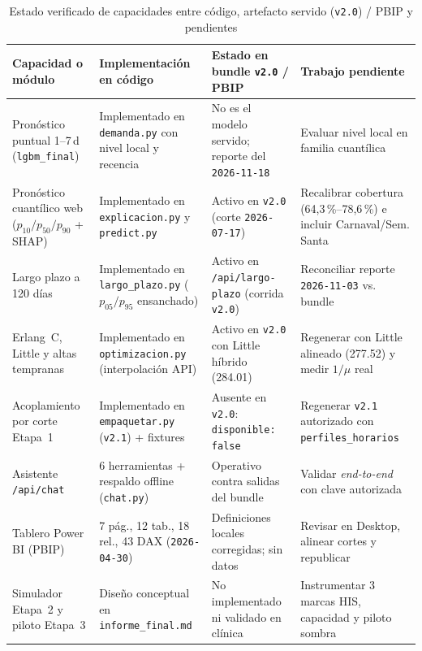 \begin{table}[t]
\caption{Estado verificado de capacidades entre código, artefacto servido (\texttt{v2.0}) / PBIP y pendientes}
\label{tab:estado_capacidades}
\centering
\footnotesize
\begin{tabularx}{\textwidth}{@{}L{0.21\textwidth} L{0.25\textwidth} L{0.24\textwidth} Y@{}}
\toprule
Capacidad o módulo & Implementación en código & Estado en bundle \texttt{v2.0} / PBIP & Trabajo pendiente \\
\midrule
Pronóstico puntual 1--7\,d (\texttt{lgbm\_final}) & Implementado en \texttt{demanda.py} con nivel local y recencia & No es el modelo servido; reporte del \texttt{2026-11-18} & Evaluar nivel local en familia cuantílica \\
Pronóstico cuantílico web ($p_{10}/p_{50}/p_{90}$ + SHAP) & Implementado en \texttt{explicacion.py} y \texttt{predict.py} & Activo en \texttt{v2.0} (corte \texttt{2026-07-17}) & Recalibrar cobertura (64,3\,\%--78,6\,\%) e incluir Carnaval/Sem. Santa \\
Largo plazo a 120 días & Implementado en \texttt{largo\_plazo.py} ($p_{05}/p_{95}$ ensanchado) & Activo en \texttt{/api/largo-plazo} (corrida \texttt{v2.0}) & Reconciliar reporte \texttt{2026-11-03} vs. bundle \\
Erlang~C, Little y altas tempranas & Implementado en \texttt{optimizacion.py} (interpolación API) & Activo en \texttt{v2.0} con Little híbrido (\num{284,01}) & Regenerar con Little alineado (\num{277,52}) y medir $1/\mu$ real \\
Acoplamiento por corte Etapa~1 & Implementado en \texttt{empaquetar.py} (\texttt{v2.1}) + fixtures & Ausente en \texttt{v2.0}: \texttt{disponible: false} & Regenerar \texttt{v2.1} autorizado con \texttt{perfiles\_horarios} \\
Asistente \texttt{/api/chat} & 6 herramientas + respaldo offline (\texttt{chat.py}) & Operativo contra salidas del bundle & Validar \textit{end-to-end} con clave autorizada \\
Tablero Power BI (PBIP) & 7 pág., 12 tab., 18 rel., 43 DAX (\texttt{2026-04-30}) & Definiciones locales corregidas; sin datos & Revisar en Desktop, alinear cortes y republicar \\
Simulador Etapa~2 y piloto Etapa~3 & Diseño conceptual en \texttt{informe\_final.md} & No implementado ni validado en clínica & Instrumentar 3 marcas HIS, capacidad y piloto sombra \\
\bottomrule
\end{tabularx}
\end{table}

